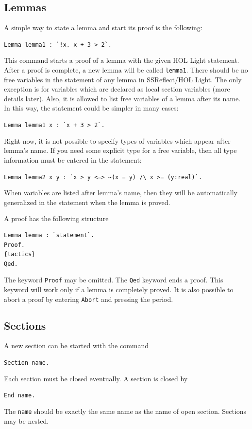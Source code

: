 \documentclass[a4paper]{article}
\begin{document}
\subsection{Lemmas}
A simple way to state a lemma and start its proof is the following:

\verb|Lemma lemma1 : `!x. x + 3 > 2`.|

This command starts a proof of a lemma with the given HOL Light statement. After a proof is complete, a new lemma will be called \verb|lemma1|. There should be no free variables in the statement of any lemma in SSReflect/HOL Light. The only exception is for variables which are declared as local section variables (more details later). Also, it is allowed to list free variables of a lemma after its name. In this way, the statement could be simpler in many cases:

\verb|Lemma lemma1 x : `x + 3 > 2`.|

Right now, it is not possible to specify types of variables which appear after lemma's name. If you need some explicit type for a free variable, then all type information must be entered in the statement:

\verb|Lemma lemma2 x y : `x > y <=> ~(x = y) /\ x >= (y:real)`.|

When variables are listed after lemma's name, then they will be automatically generalized in the statement when the lemma is proved.

A proof has the following structure

\begin{verbatim}
Lemma lemma : `statement`.
Proof.
{tactics}
Qed.
\end{verbatim}

The keyword \verb|Proof| may be omitted. The \verb|Qed| keyword ends a proof. This keyword will work only if a lemma is completely proved. It is also possible to abort a proof by entering \verb|Abort| and pressing the period.


\subsection{Sections}
A new section can be started with the command

\verb|Section name.|

Each section must be closed eventually. A section is closed by 

\verb|End name.| 

The {\tt name} should be exactly the same name as the name of open section. Sections may be nested.
\end{document}
